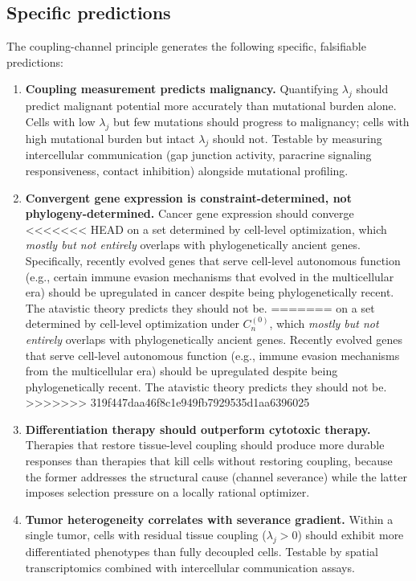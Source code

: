 \documentclass[11pt]{article}
\theoremstyle{definition}
\theoremstyle{remark}
\begin{document}
\subsection{Specific predictions}

The coupling-channel principle generates the following specific,
falsifiable predictions:

\begin{enumerate}
\item \textbf{Coupling measurement predicts malignancy.} Quantifying
   $\lambda_j$ should predict malignant potential more accurately than
   mutational burden alone. Cells with low $\lambda_j$ but few
   mutations should progress to malignancy; cells with high
   mutational burden but intact $\lambda_j$ should not. Testable by
   measuring intercellular communication (gap junction activity,
   paracrine signaling responsiveness, contact inhibition) alongside
   mutational profiling.

\item \textbf{Convergent gene expression is constraint-determined,
   not phylogeny-determined.} Cancer gene expression should converge
<<<<<<< HEAD
   on a set determined by cell-level optimization, which \emph{mostly
   but not entirely} overlaps with phylogenetically ancient genes.
   Specifically, recently evolved genes that serve cell-level
   autonomous function (e.g., certain immune evasion mechanisms that
   evolved in the multicellular era) should be upregulated in cancer
   despite being phylogenetically recent. The atavistic theory
   predicts they should not be.
=======
   on a set determined by cell-level optimization under $C_n^{(0)}$,
   which \emph{mostly but not entirely} overlaps with
   phylogenetically ancient genes. Recently evolved genes that serve
   cell-level autonomous function (e.g., immune evasion mechanisms
   from the multicellular era) should be upregulated despite being
   phylogenetically recent. The atavistic theory predicts they
   should not be.
>>>>>>> 319f447daa46f8c1e949fb7929535d1aa6396025

\item \textbf{Differentiation therapy should outperform cytotoxic
   therapy.} Therapies that restore tissue-level coupling should
   produce more durable responses than therapies that kill cells
   without restoring coupling, because the former addresses the
   structural cause (channel severance) while the latter imposes
   selection pressure on a locally rational optimizer.

\item \textbf{Tumor heterogeneity correlates with severance
   gradient.} Within a single tumor, cells with residual
   tissue coupling ($\lambda_j > 0$) should exhibit more
   differentiated phenotypes than fully decoupled cells. Testable by
   spatial transcriptomics combined with intercellular communication
   assays.


\end{enumerate}
\end{document}
